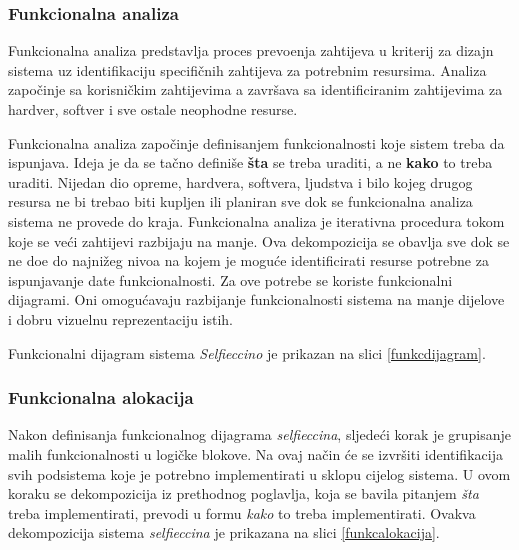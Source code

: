 \documentclass[12pt]{article}
\begin{document}
\subsubsection{Funkcionalna analiza}
Funkcionalna analiza predstavlja proces prevo\dj enja zahtijeva u kriterij za dizajn sistema uz identifikaciju specifi\v{c}nih zahtijeva za potrebnim resursima. Analiza zapo\v{c}inje sa korisni\v{c}kim zahtijevima a zavr\v{s}ava sa identificiranim zahtijevima za hardver, softver i sve ostale neophodne resurse.

Funkcionalna analiza zapo\v{c}inje definisanjem funkcionalnosti koje sistem treba da ispunjava. Ideja je da se ta\v{c}no defini\v{s}e \textbf{\v{s}ta} se treba uraditi, a ne \textbf{kako} to treba uraditi. Nijedan dio opreme, hardvera, softvera, ljudstva i bilo kojeg drugog resursa ne bi trebao biti kupljen ili planiran sve dok se funkcionalna analiza sistema ne provede do kraja. Funkcionalna analiza je iterativna procedura tokom koje se ve\'ci zahtijevi razbijaju na manje. Ova dekompozicija se obavlja sve dok se ne do\dj e do najni\v{z}eg nivoa na kojem je mogu\'ce identificirati resurse potrebne za ispunjavanje date funkcionalnosti. Za ove potrebe se koriste funkcionalni dijagrami. Oni omogu\'cavaju razbijanje funkcionalnosti sistema na manje dijelove i dobru vizuelnu reprezentaciju istih. 

Funkcionalni dijagram sistema \textit{Selfieccino} je prikazan na slici \ref{funkcdijagram}. 

\subsubsection{Funkcionalna alokacija}
Nakon definisanja funkcionalnog dijagrama \textit{selfieccina}, sljede\'ci korak je grupisanje malih funkcionalnosti u logi\v{c}ke blokove. Na ovaj na\v{c}in \'ce se izvr\v{s}iti identifikacija svih podsistema koje je potrebno implementirati u sklopu cijelog sistema. U ovom koraku se dekompozicija iz prethodnog poglavlja, koja se bavila pitanjem \textit{\v{s}ta} treba implementirati, prevodi u formu \textit{kako} to treba implementirati. Ovakva dekompozicija sistema \textit{selfieccina} je prikazana na slici \ref{funkcalokacija}.

\newpage
\end{document}
